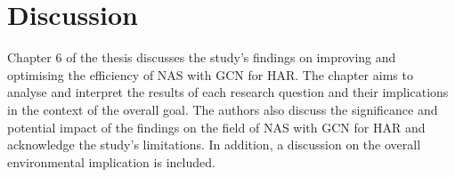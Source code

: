 \chapter{Discussion}\label{discussion}
\begin{comment}
This chapter aims to analyse and interpret the findings of our study in the context of the overall goal and research questions. Our research aimed to improve and optimise the efficiency of neural architecture search (\gls{NAS}) with graph convolutional networks (\gls{GCN}) for human action recognition (\gls{HAR}). The authors will first interpret the results of each research question and discuss their implications in the context of the overall goal. We will then consider the significance of our findings and their potential impact on the field of \gls{NAS} with \gls{GCN} for \gls{HAR}. Furthermore, we will acknowledge the limitations of our study. 
\end{comment}
Chapter 6 of the thesis discusses the study's findings on improving and optimising the efficiency of \gls{NAS} with \gls{GCN} for \gls{HAR}. The chapter aims to analyse and interpret the results of each research question and their implications in the context of the overall goal. The authors also discuss the significance and potential impact of the findings on the field of \gls{NAS} with \gls{GCN} for \gls{HAR} and acknowledge the study's limitations. In addition, a discussion on the overall environmental implication is included. 

\begin{comment}
    In this chapter, the method and experimental result are analysed and discussed regarding
their merits and limitations in light of research from the literature. The chapter is
concluded with a discussion of how the research questions are answered.
\end{comment}

%


